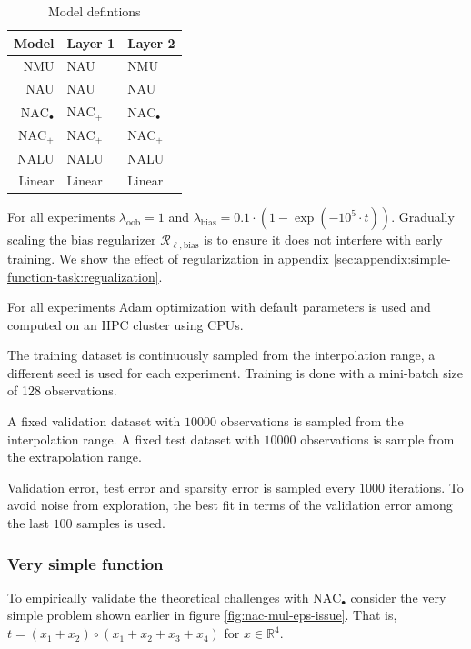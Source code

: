\begin{table}[H]
\caption{Model defintions}
\label{tab:model-defintions}
\centering
\begin{tabular}{r l l}
\toprule
 Model & Layer 1 & Layer 2 \\
 \midrule
 NMU & NAU & NMU \\
 NAU & NAU & NAU \\
 $\mathrm{NAC}_{\bullet}$ & $\mathrm{NAC}_{+}$ & $\mathrm{NAC}_{\bullet}$ \\
 $\mathrm{NAC}_{+}$ & $\mathrm{NAC}_{+}$ & $\mathrm{NAC}_{+}$ \\
 NALU & NALU & NALU \\
 Linear & Linear & Linear \\
 \bottomrule
\end{tabular}
\end{table}

For all experiments $\lambda_{\mathrm{oob}} = 1$ and $\lambda_{\mathrm{bias}} = 0.1 \cdot (1 - \exp(-10^5 \cdot t))$. Gradually scaling the bias regularizer $\mathcal{R}_{\ell,\mathrm{bias}}$ is to ensure it does not interfere with early training. We show the effect of regularization in appendix \ref{sec:appendix:simple-function-task:regualization}.

For all experiments Adam optimization \cite{adam-optimization} with default parameters is used and computed on an HPC cluster using  CPUs.

The training dataset is continuously sampled from the interpolation range, a different seed is used for each experiment. Training is done with a mini-batch size of 128 observations.

A fixed validation dataset with $10000$ observations is sampled from the interpolation range. A fixed test dataset with $10000$ observations is sample from the extrapolation range.

Validation error, test error and sparsity error is sampled every $1000$ iterations. To avoid noise from exploration, the best fit in terms of the validation error among the last $100$ samples is used.

\subsubsection{Very simple function}

To empirically validate the theoretical challenges with $\mathrm{NAC}_{\bullet}$ consider the very simple problem shown earlier in figure \ref{fig:nac-mul-eps-issue}. That is, $t = (x_1 + x_2) \circ (x_1 + x_2 + x_3 + x_4)$ for $x \in \mathbb{R}^4$.

